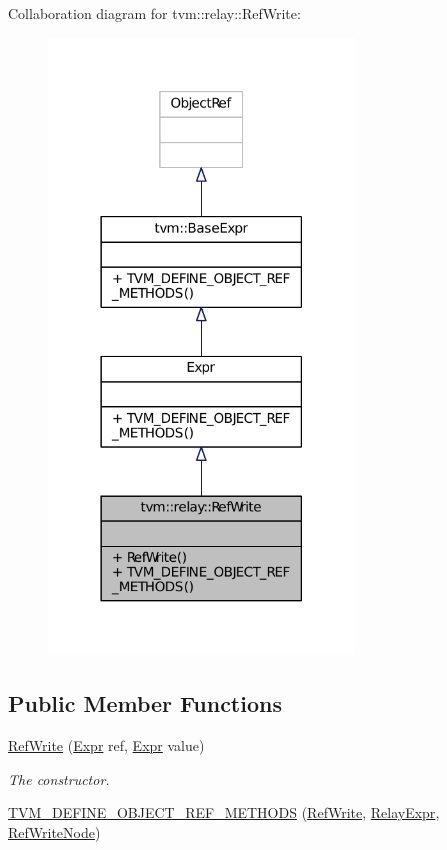 Collaboration diagram for tvm\+:\+:relay\+:\+:Ref\+Write\+:
\nopagebreak
\begin{figure}[H]
\begin{center}
\leavevmode
\includegraphics[width=230pt]{classtvm_1_1relay_1_1RefWrite__coll__graph}
\end{center}
\end{figure}
\subsection*{Public Member Functions}
\begin{DoxyCompactItemize}
\item 
\hyperlink{classtvm_1_1relay_1_1RefWrite_a63c7cb560608f4303e4cb75987bb8647}{Ref\+Write} (\hyperlink{namespacetvm_1_1relay_a5b84e3790f89bb3fad5c7911eeb99531}{Expr} ref, \hyperlink{namespacetvm_1_1relay_a5b84e3790f89bb3fad5c7911eeb99531}{Expr} value)
\begin{DoxyCompactList}\small\item\em The constructor. \end{DoxyCompactList}\item 
\hyperlink{classtvm_1_1relay_1_1RefWrite_a035b0c93f5668e0bb69f084b37f3c3cd}{T\+V\+M\+\_\+\+D\+E\+F\+I\+N\+E\+\_\+\+O\+B\+J\+E\+C\+T\+\_\+\+R\+E\+F\+\_\+\+M\+E\+T\+H\+O\+DS} (\hyperlink{classtvm_1_1relay_1_1RefWrite}{Ref\+Write}, \hyperlink{classtvm_1_1RelayExpr}{Relay\+Expr}, \hyperlink{classtvm_1_1relay_1_1RefWriteNode}{Ref\+Write\+Node})
\end{DoxyCompactItemize}


